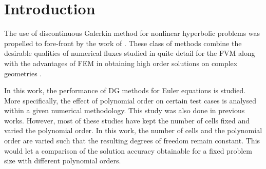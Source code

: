 \documentclass[a4paper,11pt,oneside]{article}
\newcommand{\citear}[1]{\citeauthor{#1} \cite{#1}} %
\begin{document}
\onehalfspacing %
\raggedbottom %

\tableofcontents

\section{Introduction}
\label{sec:intro}

The use of discontinuous Galerkin method for nonlinear hyperbolic problems was propelled to fore-front by the work of \citear{cockburnShu1998a}. These class of methods combine the desirable qualities of numerical fluxes studied in quite detail for the FVM along with the advantages of FEM in obtaining high order solutions on complex geometries \cite{cockburnShu2001}.

In this work, the performance of DG methods for Euler equations is studied. More specifically, the effect of polynomial order on certain test cases is analysed within a given numerical methodology. This study was also done in previous works. However, most of these studies have kept the number of cells fixed and varied the polynomial order. In this work, the number of cells and the polynomial order are varied such that the resulting degrees of freedom remain constant. This would let a comparison of the solution accuracy obtainable for a fixed problem size with different polynomial orders.

\printbibliography
\end{document}
